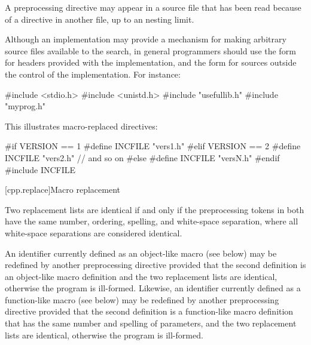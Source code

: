\pnum
A
preprocessing directive may appear
in a source file that has been read because of a
directive in another file,
up to an  nesting limit.

\pnum
\begin{note}
Although an implementation may provide a mechanism for making arbitrary
source files available to the \tcode{< >} search, in general
programmers should use the \tcode{< >} form for headers provided
with the implementation, and the  form for sources
outside the control of the implementation. For instance:

\begin{codeblock}
#include <stdio.h>
#include <unistd.h>
#include "usefullib.h"
#include "myprog.h"
\end{codeblock}

\end{note}

\pnum
\begin{example}
This illustrates macro-replaced
directives:

\begin{codeblock}
#if VERSION == 1
    #define INCFILE  "vers1.h"
#elif VERSION == 2
    #define INCFILE  "vers2.h"  // and so on
#else
    #define INCFILE  "versN.h"
#endif
#include INCFILE
\end{codeblock}
\end{example}

[cpp.replace]{Macro replacement}%
%
%

\pnum
{}%
Two replacement lists are identical if and only if
the preprocessing tokens in both have
the same number, ordering, spelling, and white-space separation,
where all white-space separations are considered identical.

\pnum
An identifier currently defined as an
%
%
object-like macro (see below) may be redefined by another
preprocessing directive provided that the second definition is an
object-like macro definition and the two replacement lists
are identical, otherwise the program is ill-formed.
Likewise, an identifier currently defined as a
%
%
function-like macro (see below) may be redefined by another
preprocessing directive provided that the second definition is a
function-like macro definition that has the same number and spelling
of parameters,
and the two replacement lists are identical,
otherwise the program is ill-formed.

